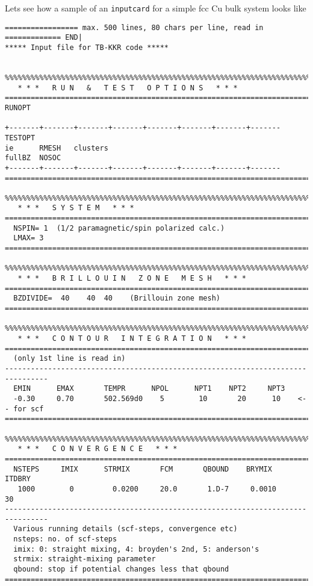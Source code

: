 \documentclass[11pt,fleqn]{book} %
\begin{document}
Lets see how a sample of an \verb;inputcard; for a simple fcc Cu bulk system looks like
\begin{VBox}
{\scriptsize{
\begin{verbatim}
================= max. 500 lines, 80 chars per line, read in  ============= END|
***** Input file for TB-KKR code *****


%%%%%%%%%%%%%%%%%%%%%%%%%%%%%%%%%%%%%%%%%%%%%%%%%%%%%%%%%%%%%%%%%%%%%%%%%%%%%%%%
   * * *   R U N   &   T E S T   O P T I O N S   * * *
================================================================================
RUNOPT
                                           
+-------+-------+-------+-------+-------+-------+-------+-------
TESTOPT
ie      RMESH   clusters
fullBZ  NOSOC             
+-------+-------+-------+-------+-------+-------+-------+-------
================================================================================

%%%%%%%%%%%%%%%%%%%%%%%%%%%%%%%%%%%%%%%%%%%%%%%%%%%%%%%%%%%%%%%%%%%%%%%%%%%%%%%%
   * * *   S Y S T E M   * * *
================================================================================
  NSPIN= 1  (1/2 paramagnetic/spin polarized calc.)
  LMAX= 3
================================================================================

%%%%%%%%%%%%%%%%%%%%%%%%%%%%%%%%%%%%%%%%%%%%%%%%%%%%%%%%%%%%%%%%%%%%%%%%%%%%%%%%
   * * *   B R I L L O U I N   Z O N E   M E S H   * * *
================================================================================
  BZDIVIDE=  40    40  40    (Brillouin zone mesh)
================================================================================

%%%%%%%%%%%%%%%%%%%%%%%%%%%%%%%%%%%%%%%%%%%%%%%%%%%%%%%%%%%%%%%%%%%%%%%%%%%%%%%%
   * * *   C O N T O U R   I N T E G R A T I O N   * * *
================================================================================
  (only 1st line is read in)
--------------------------------------------------------------------------------
  EMIN      EMAX       TEMPR      NPOL      NPT1    NPT2     NPT3
  -0.30     0.70       502.569d0    5        10       20      10    <-- for scf
================================================================================

%%%%%%%%%%%%%%%%%%%%%%%%%%%%%%%%%%%%%%%%%%%%%%%%%%%%%%%%%%%%%%%%%%%%%%%%%%%%%%%%
   * * *   C O N V E R G E N C E   * * *
================================================================================
  NSTEPS     IMIX      STRMIX       FCM       QBOUND    BRYMIX      ITDBRY
   1000        0         0.0200     20.0       1.D-7     0.0010      30
--------------------------------------------------------------------------------
  Various running details (scf-steps, convergence etc)
  nsteps: no. of scf-steps
  imix: 0: straight mixing, 4: broyden's 2nd, 5: anderson's
  strmix: straight-mixing parameter
  qbound: stop if potential changes less that qbound
================================================================================


\end{verbatim}}}
\end{VBox}
\end{document}
